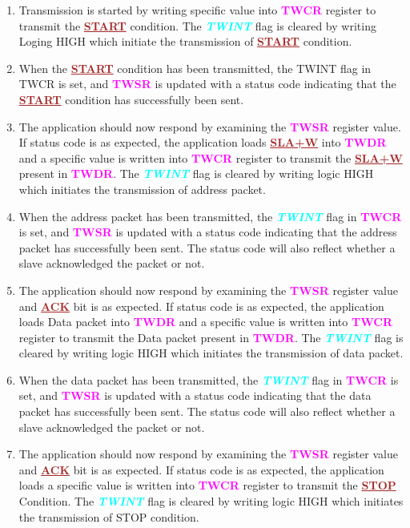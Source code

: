 \documentclass{article}
\newcommand{\bitFormat}[1]{\emph{\textbf{\textcolor{cyan}{#1}}}}
\newcommand{\regFormat}[1]{\textbf{\textcolor{magenta}{#1}}}
\newcommand{\iicFormat}[1]{\textbf{\textcolor{brown}{\underline{#1}}}}
\begin{document}
\begin{enumerate}
    \item Transmission is started by writing specific value into \regFormat{TWCR} register to transmit the \iicFormat{START} condition. The \bitFormat{TWINT} flag is cleared by writing Loging HIGH which initiate the transmission of \iicFormat{START} condition.
    \item When the \iicFormat{START} condition has been transmitted, the TWINT flag in TWCR is set, and \regFormat{TWSR} is updated with a status code indicating that the \iicFormat{START} condition has successfully been sent.
    \item The application should now respond by examining the \regFormat{TWSR} register value. If status code is as expected, the application loads \iicFormat{SLA+W} into \regFormat{TWDR} and a specific value is written into \regFormat{TWCR} register to transmit the \iicFormat{SLA+W} present in \regFormat{TWDR}. The \bitFormat{TWINT} flag is cleared by writing logic HIGH which initiates the transmission of address packet.
    \item When the address packet has been transmitted, the \bitFormat{TWINT} flag in \regFormat{TWCR} is set, and \regFormat{TWSR} is updated with a status code indicating that the address packet has successfully been sent. The status code will also reflect whether a slave acknowledged the packet or not.
    \item The application should now respond by examining the \regFormat{TWSR} register value and \iicFormat{ACK} bit is as expected. If status code is as expected, the application loads Data packet into \regFormat{TWDR} and a specific value is written into \regFormat{TWCR} register to transmit the Data packet present in \regFormat{TWDR}. The \bitFormat{TWINT} flag is cleared by writing logic HIGH which initiates the transmission of data packet.
    \item When the data packet has been transmitted, the \bitFormat{TWINT} flag in \regFormat{TWCR} is set, and \regFormat{TWSR} is updated with a status code indicating that the data packet has successfully been sent. The status code will also reflect whether a slave acknowledged the packet or not.
    \item The application should now respond by examining the \regFormat{TWSR} register value and \iicFormat{ACK} bit is as expected. If status code is as expected, the application loads a specific value is written into \regFormat{TWCR} register to transmit the \iicFormat{STOP} Condition. The \bitFormat{TWINT} flag is cleared by writing logic HIGH which initiates the transmission of STOP condition.
\end{enumerate}
\end{document}
